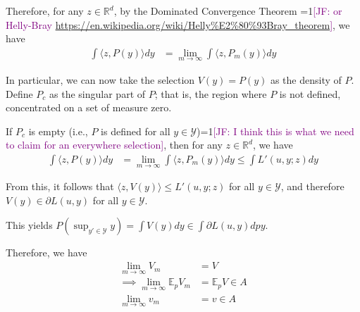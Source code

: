 \documentclass{article}
\newcommand{\Comments}{1}
\newcommand{\mynote}[2]{\ifnum\Comments=1\textcolor{#1}{#2}\fi}
\newcommand{\jessie}[1]{\mynote{purple}{[JF: #1]}}
\newcommand{\reals}{\mathbb{R}}
\newcommand{\E}{\mathbb{E}}
\newcommand{\Y}{\mathcal{Y}}
\newcommand{\inprod}[2]{\langle #1, #2 \rangle}%
\begin{document}
Therefore, for any $z \in \reals^d$, by the Dominated Convergence Theorem \jessie{or Helly-Bray \url{https://en.wikipedia.org/wiki/Helly\%E2\%80\%93Bray_theorem}}, we have 
\begin{align*}
\int \inprod{z}{P(y)} dy &= \lim_{m \to \infty} \int \inprod{z}{P_m(y)} dy
\end{align*}

In particular, we can now take the selection $V(y) = P(y)$ as the density of $P$.
Define $P_c$ as the singular part of $P$; that is, the region where $P$ is not defined, concentrated on a set of measure zero.

If $P_c$ is empty (i.e., $P$ is defined for all $y \in \Y$)\jessie{I think this is what we need to claim for an everywhere selection}, then for any $z \in \reals^d$, we have
\begin{align*}
\int \inprod{z}{P(y)} dy &= \lim_{m \to \infty} \int \inprod{z}{P_m(y)} dy \leq \int L'(u,y;z) dy
\end{align*}

From this, it follows that $\inprod{z}{V(y)} \leq L'(u,y;z)$ for all $y \in \Y$, and therefore $V(y) \in \partial L(u,y)$ for all $y \in \Y$.

This yields $P(\sup_{y' \in \Y} y) = \int V(y) dy \in \int \partial L(u,y) dpy$.

Therefore, we have 
\begin{align*}
\lim_{m\to \infty} V_m &= V \\
\implies \lim_{m \to \infty} \E_p V_m &= \E_p V \in A\\
\lim_{m \to \infty} v_m &= v \in A
\end{align*}
\end{document}
